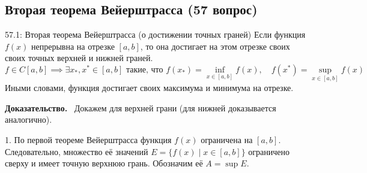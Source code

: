 \documentclass[a4paper,12pt]{article}
\newcommand{\myproof}{\textbf{Доказательство.}\ }
\begin{document}
	\begin{center}
	\end{center}
	
	
	
	
	
	\newpage
	\subsection{Вторая теорема Вейерштрасса (57 вопрос)}
	
	\begin{theorembox}{57.1: Вторая теорема Вейерштрасса (о достижении точных граней)}
		Если функция $f(x)$ непрерывна на отрезке $[a, b]$, то она достигает на этом отрезке своих своих точных верхней и нижней граней.
		$$ f \in C[a, b] \implies \exists x_*, x^* \in [a, b] \text{ такие, что } f(x_*) = \inf_{x \in [a, b]} f(x), \quad f(x^*) = \sup_{x \in [a, b]} f(x) $$
		Иными словами, функция достигает своих максимума и минимума на отрезке.
	\end{theorembox}
	
	\myproof
	Докажем для верхней грани (для нижней доказывается аналогично).
	
	1. По первой теореме Вейерштрасса функция $f(x)$ ограничена на $[a, b]$. Следовательно, множество её значений $E = \{f(x) \mid x \in [a, b]\}$ ограничено сверху и имеет точную верхнюю грань. Обозначим её $A = \sup E$.
	
\end{document}
